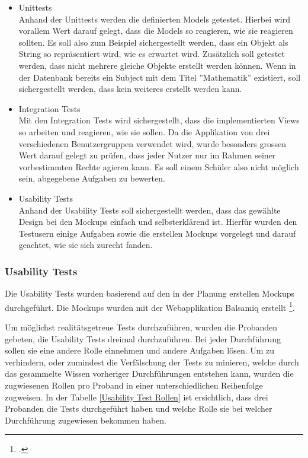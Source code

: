 \begin{itemize}
	\item Unittests \\
		Anhand der Unittests werden die definierten Models getestet. Hierbei wird vorallem Wert darauf gelegt, dass die Models so reagieren, wie sie reagieren sollten. Es soll also zum Beispiel sichergestellt werden, dass ein Objekt als String so repräsentiert wird, wie es erwartet wird. Zusätzlich soll getestet werden, dass nicht mehrere gleiche Objekte erstellt werden können. Wenn in der Datenbank bereits ein Subject mit dem Titel ''Mathematik'' existiert, soll sichergestellt werden, dass kein weiteres erstellt werden kann.
		
	\item Integration Tests \\
		Mit den Integration Tests wird sichergestellt, dass die implementierten Views so arbeiten und reagieren, wie sie sollen. Da die Applikation von drei verschiedenen Benutzergruppen verwendet wird, wurde besonders grossen Wert darauf gelegt zu prüfen, dass jeder Nutzer nur im Rahmen seiner vorbestimmten Rechte agieren kann. Es soll einem Schüler also nicht möglich sein, abgegebene Aufgaben zu bewerten.
		
	\item Usability Tests \\
		Anhand der Usability Tests soll sichergestellt werden, dass das gewählte Design bei den Mockups einfach und selbsterklärend ist. Hierfür wurden den Testusern einige Aufgaben sowie die erstellen Mockups vorgelegt und darauf geachtet, wie sie sich zurecht fanden.
\end{itemize}


\subsubsection*{Usability Tests}
Die Usability Tests wurden basierend auf den in der Planung erstellen Mockups durchgeführt. Die Mockups wurden mit der Webapplikation Balsamiq erstellt \footcite{balsamiq_mockups}.



Um möglichst realitätsgetreue Tests durchzuführen, wurden die Probanden gebeten, die Usability Tests dreimal durchzuführen. Bei jeder Durchführung sollen sie eine andere Rolle einnehmen und andere Aufgaben lösen. Um zu verhindern, oder zumindest die Verfälschung der Tests zu minieren, welche durch das gesammelte Wissen vorheriger Durchführungen entstehen kann, wurden die zugwiesenen Rollen pro Proband in einer unterschiedlichen Reihenfolge zugweisen. In der Tabelle \ref{Usability Test Rollen} ist ersichtlich, dass drei Probanden die Tests durchgeführt haben und welche Rolle sie bei welcher Durchführung zugewiesen bekommen haben. \\


